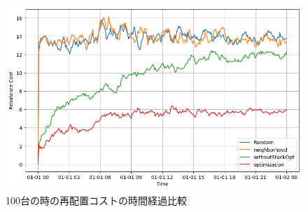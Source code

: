           \begin{figure}[htbp]
            \centering
            \includegraphics[scale=0.36]
            {figures/CompareRebalanceCost-100.png}
            \caption{100台の時の再配置コストの時間経過比較}
            \label{fig:100台の時の再配置コストの時間経過比較}
          \end{figure}
      
      
          
